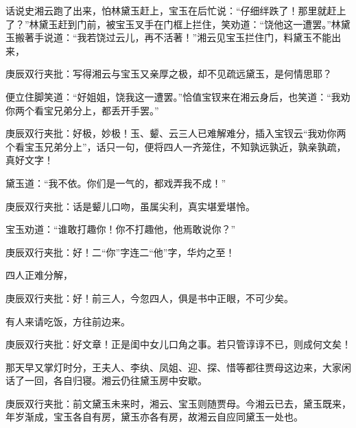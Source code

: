 \begin{parag}
    话说史湘云跑了出来，怕林黛玉赶上，宝玉在后忙说：“仔细绊跌了！那里就赶上了？”林黛玉赶到门前，被宝玉叉手在门框上拦住，笑劝道：“饶他这一遭罢。”林黛玉搬著手说道：“我若饶过云儿，再不活著！”湘云见宝玉拦住门，料黛玉不能出来，\begin{note}庚辰双行夹批：写得湘云与宝玉又亲厚之极，却不见疏远黛玉，是何情思耶？\end{note}便立住脚笑道：“好姐姐，饶我这一遭罢。”恰值宝钗来在湘云身后，也笑道：“我劝你两个看宝兄弟分上，都丢开手罢。”\begin{note}庚辰双行夹批：好极，妙极！玉、颦、云三人已难解难分，插入宝钗云“我劝你两个看宝玉兄弟分上”，话只一句，便将四人一齐笼住，不知孰远孰近，孰亲孰疏，真好文字！\end{note}黛玉道：“我不依。你们是一气的，都戏弄我不成！”\begin{note}庚辰双行夹批：话是颦儿口吻，虽属尖利，真实堪爱堪怜。\end{note}宝玉劝道：“谁敢打趣你！你不打趣他，他焉敢说你？”\begin{note}庚辰双行夹批：好！二“你”字连二“他”字，华灼之至！\end{note}四人正难分解，\begin{note}庚辰双行夹批：好！前三人，今忽四人，俱是书中正眼，不可少矣。\end{note}有人来请吃饭，方往前边来。\begin{note}庚辰双行夹批：好文章！正是闺中女儿口角之事。若只管谆谆不已，则成何文矣！\end{note}
\end{parag}


\begin{parag}
    那天早又掌灯时分，王夫人、李纨、凤姐、迎、探、惜等都往贾母这边来，大家闲话了一回，各自归寝。湘云仍往黛玉房中安歇。\begin{note}庚辰双行夹批：前文黛玉未来时，湘云、宝玉则随贾母。今湘云已去，黛玉既来，年岁渐成，宝玉各自有房，黛玉亦各有房，故湘云自应同黛玉一处也。\end{note}
\end{parag}


